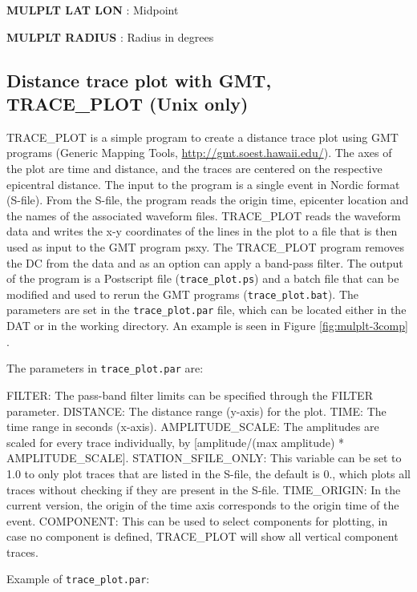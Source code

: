 \textbf{MULPLT LAT LON }: Midpoint 

\textbf{MULPLT RADIUS }: Radius in degrees 

\subsection{Distance trace plot with GMT, TRACE\_PLOT (Unix only)}
TRACE\_PLOT is a simple program to create a distance trace plot using GMT programs (Generic Mapping Tools, \url{http://gmt.soest.hawaii.edu/}). The axes of the plot are time and distance, and the traces are centered on the respective epicentral distance. The input to the program is a single event in Nordic format (S-file). From the S-file, the program reads the origin time, epicenter location and the names of the associated waveform files. TRACE\_PLOT reads the waveform data and writes the x-y coordinates of the lines in the plot to a file that is then used as input to the GMT program psxy. The TRACE\_PLOT program removes the DC from the data and as an option can apply a band-pass filter. The output of the program is a Postscript file (\texttt{trace\_plot.ps}) and a batch file that can be modified and used to rerun the GMT programs (\texttt{trace\_plot.bat}). The parameters are set in the \texttt{trace\_plot.par} file, which can be located either in the DAT or in the working directory. An example is seen in Figure 
\ref{fig:mulplt-3comp}
. 

The parameters in \texttt{trace\_plot.par} are: 

FILTER: The pass-band filter limits can be specified through the FILTER parameter.\newline
DISTANCE: The distance range (y-axis) for the plot.\newline
TIME: The time range in seconds (x-axis).\newline
AMPLITUDE\_SCALE: The amplitudes are scaled for every trace individually, by  [amplitude/(max 
amplitude) * AMPLITUDE\_SCALE]. \newline
STATION\_SFILE\_ONLY: This variable can be set to 1.0 to only plot 
traces that are listed in the S-file, the default is 0., which plots 
all traces without checking if they are present in the S-file. \newline
TIME\_ORIGIN: In the current version, the origin of the time axis 
corresponds to the origin time of the event. \newline
COMPONENT: This can be used to select components for plotting, in case no component is defined, TRACE\_PLOT will show all vertical component traces. 

Example of \texttt{trace\_plot.par}: 



